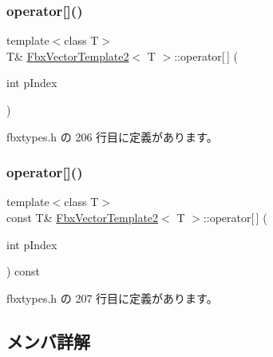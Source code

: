 \subsubsection{\texorpdfstring{operator[]()}{operator[]()}\hspace{0.1cm}{\footnotesize\ttfamily [1/2]}}
{\footnotesize\ttfamily template$<$class T$>$ \\
T\& \hyperlink{class_fbx_vector_template2}{Fbx\+Vector\+Template2}$<$ T $>$\+::operator\mbox{[}$\,$\mbox{]} (\begin{DoxyParamCaption}\item[{int}]{p\+Index }\end{DoxyParamCaption})\hspace{0.3cm}{\ttfamily [inline]}}



 fbxtypes.\+h の 206 行目に定義があります。

\mbox{\label{class_fbx_vector_template2_a87dc10a49d55552616bafa4f6bca26fa}} 
\subsubsection{\texorpdfstring{operator[]()}{operator[]()}\hspace{0.1cm}{\footnotesize\ttfamily [2/2]}}
{\footnotesize\ttfamily template$<$class T$>$ \\
const T\& \hyperlink{class_fbx_vector_template2}{Fbx\+Vector\+Template2}$<$ T $>$\+::operator\mbox{[}$\,$\mbox{]} (\begin{DoxyParamCaption}\item[{int}]{p\+Index }\end{DoxyParamCaption}) const\hspace{0.3cm}{\ttfamily [inline]}}



 fbxtypes.\+h の 207 行目に定義があります。



\subsection{メンバ詳解}
\mbox{\label{class_fbx_vector_template2_a3d09e5eba5b2bde333e4ebd3206c5727}} 
